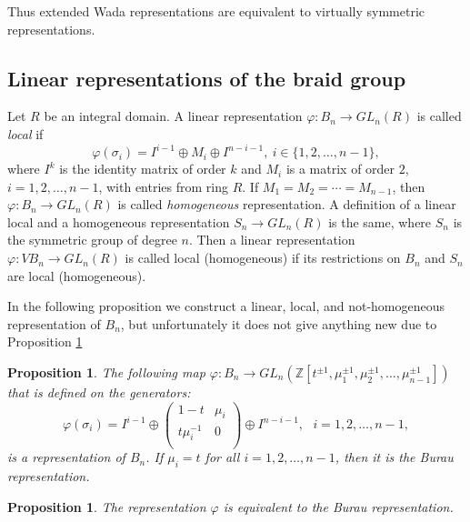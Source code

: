 \documentclass[11 pt, reqno]{amsart}
\newtheorem{proposition}[theorem]{Proposition}
\theoremstyle{definition}
\numberwithin{equation}{subsection}
\begin{document}
Thus extended Wada representations are equivalent to virtually symmetric representations.

\subsection{Linear representations of the  braid group}

Let $R$ be an integral domain. A linear representation $\varphi: B_n \to GL_n(R)$ is called {\it local} if
$$
\varphi(\sigma_i)= I^{i-1} \oplus M_i \oplus I^{n-i-1},~i \in \lbrace 1,2, \ldots, n-1 \rbrace,
$$
where $I^k$ is the identity matrix of order $k$ and $M_i$ is a matrix of order $2$, $i=1,2, \ldots, n-1$, with entries from ring $R$. If $M_1=M_2= \cdots=M_{n-1}$, then $\varphi: B_n \to GL_n(R)$ is called {\it homogeneous} representation. A definition of a linear local and a homogeneous representation 
$S_n \to GL_n(R)$ is the same, where $S_n$ is the symmetric group of degree $n$. Then a linear representation $\varphi : VB_n \to GL_n(R)$ is called local (homogeneous) if its restrictions on $B_n$ and $S_n$ are
local (homogeneous).
\par

In the following proposition we construct a linear, local, and not-homogeneous representation of $B_n$, but unfortunately it does not give anything new due to Proposition \ref{P: Equivalent to the Burau representation}

\begin{proposition}\label{P: Proposition}
The following map $\varphi : B_n \to GL_n(\mathbb{Z}[t^{\pm 1}, \mu_1^{\pm 1}, \mu_2^{\pm 1}, \ldots, \mu_{n-1}^{\pm 1}])$ that is defined on the generators:
$$
\varphi(\sigma_i) = I^{i-1} \oplus \left(
\begin{array}{cc}
  1-t &  \mu_i \\
t \mu_i^{-1} & 0 \\
\end{array}
\right) \oplus I^{n-i-1},~~~i = 1, 2, \ldots, n-1,
$$
is a representation of $B_n$. If $\mu_i = t$ for all $i = 1, 2, \ldots, n-1$, then it is the Burau representation.
\end{proposition}

\begin{proposition}\label{P: Equivalent to the Burau representation}
The representation $\varphi$ is equivalent to the Burau representation.
\end{proposition}
\end{document}
